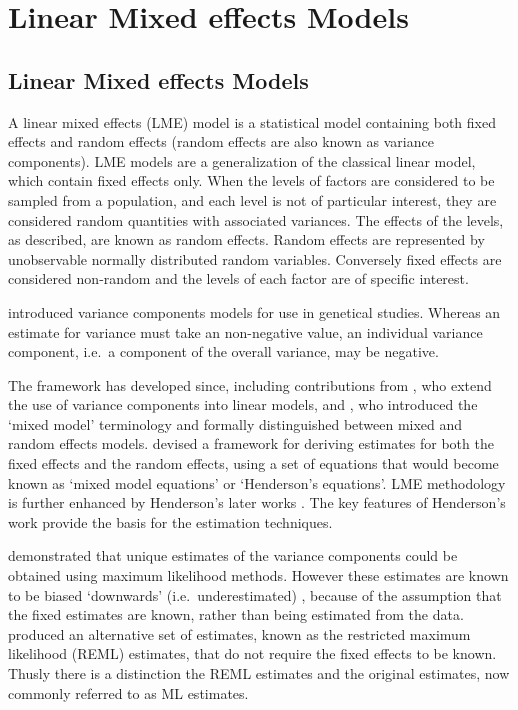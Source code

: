 \documentclass[MAIN.tex]{subfiles}
\begin{document}
	\chapter{Linear Mixed effects Models}
	\section{Linear Mixed effects Models}
	A linear mixed effects (LME) model is a statistical model containing both fixed effects and random effects (random effects are also known as variance components). LME models are a generalization of the classical linear model, which contain fixed effects only. When the levels of factors are considered to be sampled from a population,
	and each level is not of particular interest, they are considered random quantities with associated variances.
	The effects of the levels, as described, are known as random effects. Random effects are represented by unobservable
	normally distributed random variables. Conversely fixed effects are considered non-random and the
	levels of each factor are of specific interest.
	
	\citet{Fisher4} introduced variance components models for use in genetical studies. Whereas an estimate for variance must take an non-negative value, an individual variance component, i.e.\ a component of the overall variance, may be negative.
	
	The framework has developed since, including contributions from
	\citet{tippett}, who extend the use of variance components into linear models, and \citet{eisenhart}, who introduced the `mixed model' terminology and formally distinguished between mixed and random effects models. \citet{Henderson:1950} devised a framework for deriving estimates for both the fixed effects and the random effects, using a set of equations that would become known as `mixed model equations' or `Henderson's equations'.
	LME methodology is further enhanced by Henderson's later works \citep{Henderson53, Henderson59,Henderson63,Henderson73,Henderson84a}. The key features of Henderson's work provide the basis for the estimation techniques.
	
	\citet{HartleyRao} demonstrated that unique estimates of the variance components could be obtained using maximum likelihood methods. However these estimates are known to be biased `downwards' (i.e.\ underestimated) , because of the assumption that the fixed estimates are known, rather than being estimated from the data. \citet{PattersonThompson} produced an alternative set of estimates, known as the restricted maximum likelihood (REML) estimates, that do not require the fixed effects to be known. Thusly there is a distinction the REML estimates and the original estimates, now commonly referred to as ML estimates.
	
\end{document}
